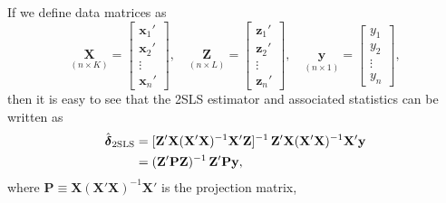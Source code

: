 If we define data matrices as
\[
  \underset{(n \times K)}{\mathbf{X}}
  = \begin{bmatrix} \mathbf{x}_1' \\ \mathbf{x}_2' \\ \vdots \\ \mathbf{x}_n' \end{bmatrix},
  \quad
  \underset{(n \times L)}{\mathbf{Z}}
  = \begin{bmatrix} \mathbf{z}_1' \\ \mathbf{z}_2' \\ \vdots \\ \mathbf{z}_n' \end{bmatrix},
  \quad
  \underset{(n \times 1)}{\mathbf{y}}
  = \begin{bmatrix} y_1 \\ y_2 \\ \vdots \\ y_n \end{bmatrix},
\]
then it is easy to see that the 2SLS estimator and associated statistics can be written as
\begin{align}
  \hat{\boldsymbol{\delta}}_{\text{2SLS}}
  &= [\mathbf{Z}'\mathbf{X}(\mathbf{X}'\mathbf{X})^{-1}\mathbf{X}'\mathbf{Z}]^{-1}\,
     \mathbf{Z}'\mathbf{X}(\mathbf{X}'\mathbf{X})^{-1}\mathbf{X}'\mathbf{y} \notag \\
  &= (\mathbf{Z}'\mathbf{P}\mathbf{Z})^{-1}\, \mathbf{Z}'\mathbf{P}\mathbf{y},
  \label{eq:3.8.3p}
\end{align}
where $\mathbf{P} \equiv \mathbf{X}(\mathbf{X}'\mathbf{X})^{-1}\mathbf{X}'$ is the projection matrix,
